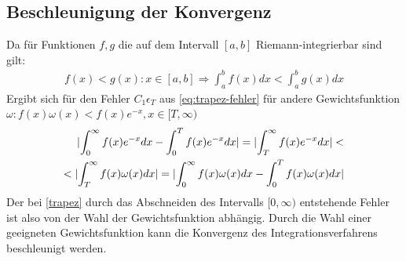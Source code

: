 \documentclass[12pt,a4paper]{scrartcl}
\numberwithin{equation}{section}
\numberwithin{myalgctr}{section}
\numberwithin{mytheoremctr}{section}
\numberwithin{mykorollarctr}{section}
\numberwithin{mylemmactr}{section}
\numberwithin{mybeispielctr}{section}
\DeclarePairedDelimiter{\abs}{\lvert}{\rvert}
\begin{document}
	\subsection{Beschleunigung der Konvergenz}
	Da f\"ur Funktionen $f,g$ die auf dem Intervall $[a,b]$ Riemann-integrierbar sind gilt: 
	\begin{align*}
		f(x)<g(x): x \in [a,b]\Rightarrow \int_{a}^{b}f(x)dx < \int_{a}^{b}g(x)dx
	\end{align*}
	Ergibt sich f\"ur den Fehler $C_1\epsilon_T$ aus \cref{eq:trapez-fehler} f\"ur andere Gewichtsfunktion $\omega : f(x)\omega(x) < f(x)e^{-x}, x \in [T,\infty)$
	\begin{align*}
		\abs{\int_{0}^{\infty}f(x)e^{-x}dx-\int_{0}^{T}f(x)e^{-x}dx} = \abs{\int_{T}^{\infty}f(x)e^{-x}dx} <\\
		< \abs{\int_{T}^{\infty}f(x)\omega(x)dx} =  \abs{\int_{0}^{\infty}f(x)\omega(x)dx-\int_{0}^{T}f(x)\omega(x)dx}
	\end{align*}	
	Der bei \cref{trapez} durch das Abschneiden des Intervalls $[0,\infty)$ entstehende Fehler ist also von der Wahl der Gewichtsfunktion abh\"angig. 
	Durch die Wahl einer geeigneten Gewichtsfunktion kann die Konvergenz des Integrationsverfahrens beschleunigt werden.
	
\end{document}
